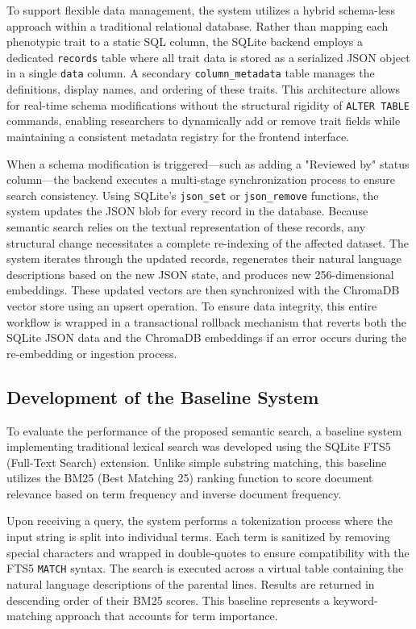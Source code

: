 \documentclass[journal]{./IEEE/IEEEtran}
\begin{document}
To support flexible data management, the system utilizes a hybrid schema-less approach within a traditional relational database. Rather than mapping each phenotypic trait to a static SQL column, the SQLite backend employs a dedicated \texttt{records} table where all trait data is stored as a serialized JSON object in a single \texttt{data} column. A secondary \texttt{column\_metadata} table manages the definitions, display names, and ordering of these traits. This architecture allows for real-time schema modifications without the structural rigidity of \texttt{ALTER TABLE} commands, enabling researchers to dynamically add or remove trait fields while maintaining a consistent metadata registry for the frontend interface.

When a schema modification is triggered—such as adding a "Reviewed by" status column—the backend executes a multi-stage synchronization process to ensure search consistency. Using SQLite's \texttt{json\_set} or \texttt{json\_remove} functions, the system updates the JSON blob for every record in the database. Because semantic search relies on the textual representation of these records, any structural change necessitates a complete re-indexing of the affected dataset. The system iterates through the updated records, regenerates their natural language descriptions based on the new JSON state, and produces new 256-dimensional embeddings. These updated vectors are then synchronized with the ChromaDB vector store using an upsert operation. To ensure data integrity, this entire workflow is wrapped in a transactional rollback mechanism that reverts both the SQLite JSON data and the ChromaDB embeddings if an error occurs during the re-embedding or ingestion process.

\subsection{Development of the Baseline System}
To evaluate the performance of the proposed semantic search, a baseline system implementing traditional lexical search was developed using the SQLite FTS5 (Full-Text Search) extension. Unlike simple substring matching, this baseline utilizes the BM25 (Best Matching 25) ranking function to score document relevance based on term frequency and inverse document frequency. 

Upon receiving a query, the system performs a tokenization process where the input string is split into individual terms. Each term is sanitized by removing special characters and wrapped in double-quotes to ensure compatibility with the FTS5 \texttt{MATCH} syntax. The search is executed across a virtual table containing the natural language descriptions of the parental lines. Results are returned in descending order of their BM25 scores. This baseline represents a keyword-matching approach that accounts for term importance.
\end{document}
